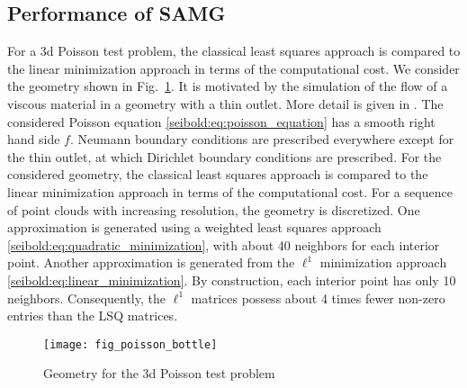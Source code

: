 \documentclass[reqno]{amsart}
\theoremstyle{plain}
\theoremstyle{definition}
\theoremstyle{remark}
\begin{document}
\subsection{Performance of SAMG}
\label{seibold:subsec:performance_samg}
For a 3d Poisson test problem, the classical least squares approach is compared to the
linear minimization approach in terms of the computational cost. We consider the geometry
shown in Fig.~\ref{seibold:fig_poisson3d_geometry}. It is motivated by the simulation of
the flow of a viscous material in a geometry with a thin outlet. More detail is given
in \cite[p.~183]{SeiboldDiss2006}. The considered Poisson
equation \eqref{seibold:eq:poisson_equation} has a smooth right hand side $f$. Neumann
boundary conditions are prescribed everywhere except for the thin outlet, at which
Dirichlet boundary conditions are prescribed. For the considered geometry, the classical
least squares approach is compared to the linear minimization approach in terms of the
computational cost. For a sequence of point clouds with increasing resolution, the
geometry is discretized. One approximation is generated using a weighted least squares
approach \eqref{seibold:eq:quadratic_minimization}, with about 40 neighbors for each
interior point. Another approximation is generated from the $\ell^1$ minimization approach
\eqref{seibold:eq:linear_minimization}. By construction, each interior point has only
10 neighbors. Consequently, the $\ell^1$ matrices possess about 4 times fewer non-zero
entries than the LSQ matrices.

\begin{figure}
\centering
\begin{minipage}[t]{.7\textwidth}
\centering
\texttt{[image: fig\_poisson\_bottle]}
\vspace{-.3em}
\caption{Geometry for the 3d Poisson test problem}
\label{seibold:fig_poisson3d_geometry}
\end{minipage}
\end{figure}
\end{document}
